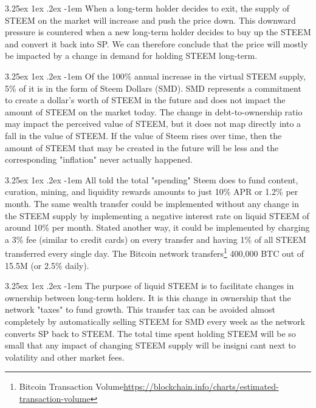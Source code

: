 \documentclass{article}
\makeatletter
\renewcommand\paragraph{\@startsection{paragraph}{5}{\z@}%
  {3.25ex \@plus1ex \@minus.2ex}%
  {-1em}%
  {\normalfont\normalsize\bfseries}}
\makeatother
\begin{document}
			\paragraph{}
				When a long-term holder decides to exit, the supply of STEEM on the market will increase and push the price down. This downward pressure is countered when a new long-term holder decides to buy up the STEEM and convert it back into SP. We can therefore conclude that the price will mostly be impacted by a change in demand for holding STEEM long-term.

			\paragraph{}
				Of the 100\% annual increase in the virtual STEEM supply, 5\% of it is in the form of Steem Dollars (SMD). SMD represents a commitment to create a dollar's worth of STEEM in the future and does not impact the amount of STEEM on the market today. The change in debt-to-ownership ratio may impact the perceived value of STEEM, but it does not map directly into a fall in the value of STEEM. If the value of Steem rises over time, then the amount of STEEM that may be created in the future will be less and the corresponding "inflation" never actually happened.

			\paragraph{}
				All told the total "spending" Steem does to fund content, curation, mining, and liquidity rewards amounts to just 10\% APR or 1.2\% per month. The same wealth transfer could be implemented without any change in the STEEM supply by implementing a negative interest rate on liquid STEEM of around 10\% per month. Stated another way, it could be implemented by charging a 3\% fee (similar to credit cards) on every transfer and having 1\% of all STEEM transferred every single day. The Bitcoin network transfers\footnote{Bitcoin Transaction Volume\newline\url{https://blockchain.info/charts/estimated-transaction-volume}} 400,000 BTC out of 15.5M (or 2.5\% daily).

			\paragraph{}
				The purpose of liquid STEEM is to facilitate changes in ownership between long-term holders. It is this change in ownership that the network "taxes" to fund growth. This transfer tax can be avoided almost completely by automatically selling STEEM for SMD every week as the network converts SP back to STEEM. The total time spent holding STEEM will be so small that any impact of changing STEEM supply will be insigni cant next to volatility and other market fees.
\end{document}
